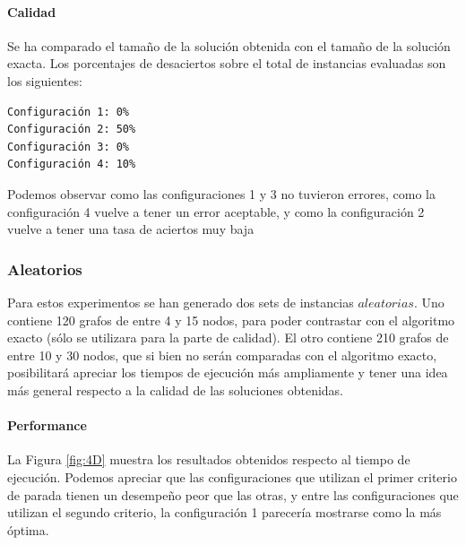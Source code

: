\paragraph{Calidad} 
Se ha comparado el tamaño de la solución obtenida con el tamaño de la solución exacta. Los porcentajes de desaciertos sobre el total de instancias evaluadas son los siguientes:

\begin{verbatim}
Configuración 1: 0%
Configuración 2: 50%
Configuración 3: 0%
Configuración 4: 10%
\end{verbatim}

Podemos observar como las configuraciones 1 y 3 no tuvieron errores, como la configuración 4 vuelve a tener un error aceptable, y como la configuración 2 vuelve a tener una tasa de aciertos muy baja

\subsubsection{Aleatorios}

Para estos experimentos se han generado dos sets de instancias $aleatorias$. Uno contiene 120 grafos de entre 4 y 15 nodos, para poder contrastar con el algoritmo exacto (sólo se utilizara para la parte de calidad). El otro contiene 210 grafos de entre 10 y 30 nodos, que si bien no serán comparadas con el algoritmo exacto, posibilitará apreciar los tiempos de ejecución más ampliamente y tener una idea más general respecto a la calidad de las soluciones obtenidas.

\paragraph{Performance} La Figura \ref{fig:4D} muestra los resultados obtenidos respecto al tiempo de ejecución. Podemos apreciar que las configuraciones que utilizan el primer criterio de parada tienen un desempeño peor que las otras, y entre las configuraciones que utilizan el segundo criterio, la configuración 1 parecería mostrarse como la más óptima.

